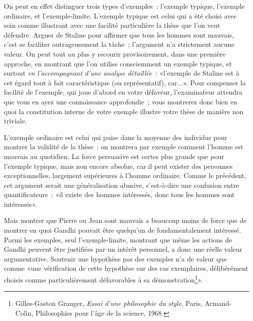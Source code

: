 \documentclass[a4paper,11pt]{article}
\newcommand{\cad}{c'est-à-dire}
\begin{document}
\par

On peut en effet distinguer trois types d'exemples~: l'exemple typique,
l'exemple ordinaire, et l'exemple-limite. L'exemple typique est celui
qui a été choisi avec soin comme illustrant avec une facilité
particulière la thèse que l'on veut défendre. Arguer de Staline pour
affirmer que tous les hommes sont mauvais, c'est se faciliter
outrageusement la tâche~; l'argument n'a strictement aucune valeur. On
peut tout au plus y recourir provisoirement, dans une première approche,
en montrant que l'on utilise consciemment un exemple typique, et surtout
\emph{en l'accompagnant d'une analyse détaillée}~: «l'exemple de Staline
est à cet égard tout à fait caractéristique (ou représentatif), car...».
Pour compenser la facilité de l'exemple, qui joue d'abord en votre
défaveur, l'examinateur attendra que vous en ayez une connaissance
approfondie~; vous montrerez donc bien en quoi la constitution interne
de votre exemple illustre votre thèse de manière non triviale.

\par

L'exemple ordinaire est celui qui puise dans la moyenne des individus
pour montrer la validité de la thèse~: on montrera par exemple comment
l'homme est mauvais au quotidien. La force persuasive est certes plus
grande que pour l'exemple typique, mais non encore absolue, car il peut
exister des personnes exceptionnelles, largement supérieures à l'homme
ordinaire. Comme le précédent, cet argument serait une généralisation
abusive, \cad{} une confusion entre quantificateurs~: «il existe des
hommes intéressés, donc tous les hommes sont intéressés».

\par

Mais montrer que Pierre ou Jean sont mauvais a beaucoup moins de force
que de montrer en quoi Gandhi pouvait être quelqu'un de fondamentalement
intéressé. Parmi les exemples, seul l'exemple-limite, montrant que même
les actions de Gandhi peuvent être justifiées par un intérêt personnel,
a donc une réelle valeur argumentative.  Soutenir une hypothèse par des
exemples n'a de valeur que comme «une vérification de cette hypothèse
sur des cas exemplaires, délibérément choisis comme particulièrement
défavorables à sa démonstration\footnote{Gilles-Gaston Granger,
  \emph{Essai d'une philosophie du style}, Paris, Armand-Colin,
  Philosophies pour l'âge de la science, 1968.}».
\end{document}
